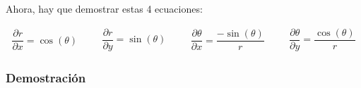 \documentclass[12pt, fleqn]{report}                             %
\DeclareMathOperator \Space {\quad}                             %
\newcommand{\Wrap}[1]{\left( #1 \right)}                        %
\newcommand{\Cos}[1]{\cos\Wrap{#1}}                             %
\newcommand{\Sin}[1]{\sin\Wrap{#1}}                             %
\newcommand \Partial[2] {\dfrac{\partial #1}{\partial #2}}      %
\begin{document}
                \clearpage

                Ahora, hay que demostrar estas 4 ecuaciones:

                \begin{equation*}
                    \begin{split}
                        \Partial{r}{x} = \Cos{\theta}
                    \end{split}
                    \Space
                    \begin{split}
                        \Partial{r}{y} = \Sin{\theta}
                    \end{split}
                    \Space
                    \begin{split}
                        \Partial{\theta}{x} = \dfrac{-\Sin{\theta}}{r}
                    \end{split}
                    \Space
                    \begin{split}
                        \Partial{\theta}{y} = \dfrac{\Cos{\theta}}{r}
                    \end{split}
                \end{equation*}


                \subsubsection{Demostración}
\end{document}
